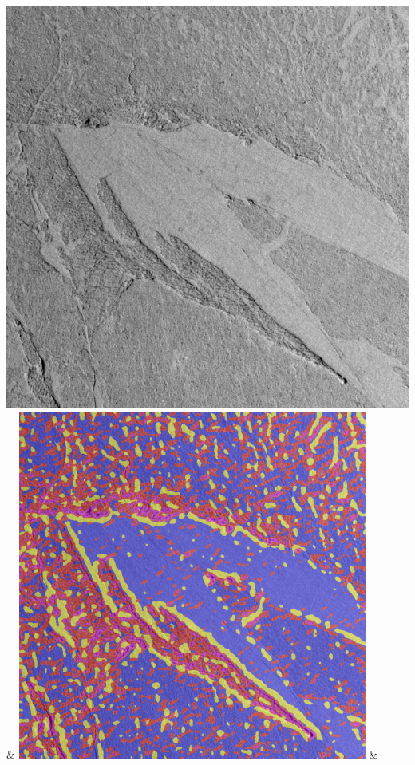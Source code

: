 \begin{table}[h!]
\begin{tabularx}{\textwidth}
		\includegraphics[width=0.9\linewidth]{images/p03/p03_03.png} &
		\includegraphics[width=0.9\linewidth]{images/gen/color_weight/p03_03.png_0.00.png} &

\end{tabularx}
\end{table}
